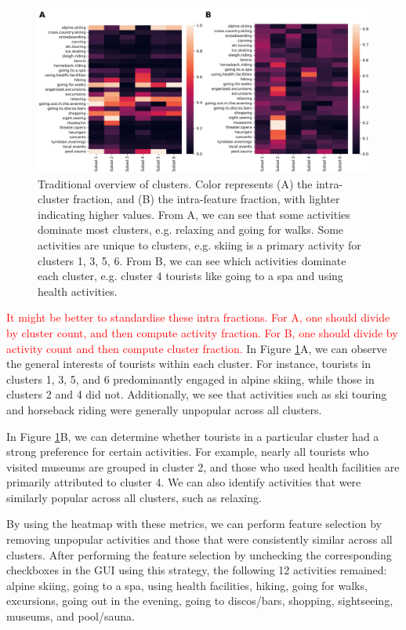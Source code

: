 \documentclass[article]{ajs}
\begin{document}
\begin{figure}[h!]
    \centering
    \includegraphics[width=1\textwidth]{winteractiv_heatmap.png}
    \caption{Traditional overview of clusters. Color represents  (A) the intra-cluster fraction, and (B) the intra-feature fraction, with lighter indicating higher values. From A, we can see that some activities dominate most clusters, e.g. relaxing and going for walks. Some activities are unique to clusters, e.g. skiing is a primary activity for clusters 1, 3, 5, 6. From B, we can see which activities dominate each cluster, e.g. cluster 4 tourists like going to a spa and using health activities.}
    \label{fig:winteractiv_heatmap}
\end{figure}

\textcolor{red}{It might be better to standardise these intra fractions. For A, one should divide by cluster count, and then compute activity fraction. For B, one should divide by activity count and then compute cluster fraction.} In Figure \ref{fig:winteractiv_heatmap}A, we can observe the general interests of tourists within each cluster. For instance, tourists in clusters 1, 3, 5, and 6 predominantly engaged in alpine skiing, while those in clusters 2 and 4 did not. Additionally, we see that activities such as ski touring and horseback riding were generally unpopular across all clusters.

In Figure \ref{fig:winteractiv_heatmap}B, we can determine whether tourists in a particular cluster had a strong preference for certain activities. For example, nearly all tourists who visited museums are grouped in cluster 2, and those who used health facilities are primarily attributed to cluster 4. We can also identify activities that were similarly popular across all clusters, such as relaxing.

By using the heatmap with these metrics, we can perform feature selection by removing unpopular activities and those that were consistently similar across all clusters. After performing the feature selection by unchecking the corresponding checkboxes in the GUI using this strategy, the following 12 activities remained: alpine skiing, going to a spa, using health facilities, hiking, going for walks, excursions, going out in the evening, going to discos/bars, shopping, sightseeing, museums, and pool/sauna.
\end{document}
